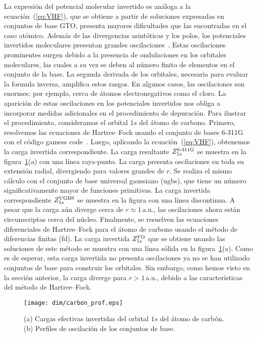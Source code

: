 La expresión del potencial molecular invertido es análoga a la
ecuación~(\ref{eq:VHF}), que se obtiene a partir de soluciones expresadas
en conjuntos de base GTO, presenta mayores dificultades que las encontradas
en el caso atómico. Además de las divergencias asintóticas y los polos, 
los potenciales invertidos moleculares presentan grandes 
oscilaciones~\cite{Schipper:97,Mura:97,Jacob:11,Gaiduk:13}. 
Estas oscilaciones prominentes surgen debido a la presencia de 
ondulaciones en los orbitales moleculares, las cuales a su vez se deben 
al número finito de elementos en el conjunto de la base. La segunda
derivada de los orbitales, necesaria para evaluar la formula inversa,
amplifica estos rasgos. En algunos casos, las oscilaciones son enormes;
por ejemplo, cerca de átomos electronegativos como el cloro. La 
aparición de estas oscilaciones en los potenciales invertidos nos obliga
a incorporar medidas adicionales en el procedimiento de depuración.
Para ilustrar el procedimiento, consideramos el orbital $1s$ del
átomo de carbono. Primero, resolvemos las ecuaciones de Hartree--Fock 
usando el conjunto de bases \mbox{6-311G} con el código {\sc gamess} code~\cite{Schmidt:93,Gordon:05}. Luego, aplicando la ecuación~(\ref{eq:VHF}),
obtenemos la carga invertida correspondiente. La carga resultante
$Z_{1s}^{\mbox{\scriptsize 6-311G}}$ se muestra en la 
figura~\ref{fig:1sCarbon}(a) con una línea raya-punto. La carga presenta
oscilaciones en toda su extensión radial, divergiendo para valores 
grandes de $r$. Se realiza el mismo cálculo con el conjunto de base 
universal gaussiano (\acs{ugbs}), que tiene un número significativamente 
mayor de funciones primitivas. La carga invertida correspondiente 
$Z_{1s}^{\mbox{\scriptsize UGBS}}$ se muestra en la figura con una línea 
discontinua. A pesar que la carga aún diverge cerca de $r\approx1\,$a.u., 
las oscilaciones ahora están circunscriptas cerca del núcleo. Finalmente,
se resuelven las ecuaciones diferenciales de Hartree--Fock para el 
átomo de carbono usando el método de diferencias finitas (\acs{fd}). La
carga invertida $Z_{1s}^{\mbox{\scriptsize FD}}$ que se obtiene usando 
las soluciones de este método se muestra con una línea sólida en la 
figura~\ref{fig:1sCarbon}(a). Como es de esperar, esta carga invertida 
no presenta oscilaciones ya no se han utilizado conjuntos de base para
construir los orbitales. Sin embargo, como hemos visto en la sección
anterior, la carga diverge para $r>1\,$a.u., debido a las características
del método de Hartree--Fock.

\begin{figure}[t]
\centering
\texttt{[image: dim/carbon\_prof.eps]}
\caption[Inversión de funciones de onda descritas con conjuntos de base.]
{(a) Cargas efectivas invertidas del orbital $1s$ del átomo de carbón.
(b) Perfiles de oscilación de los conjuntos de base.}
\label{fig:1sCarbon}
\end{figure}

